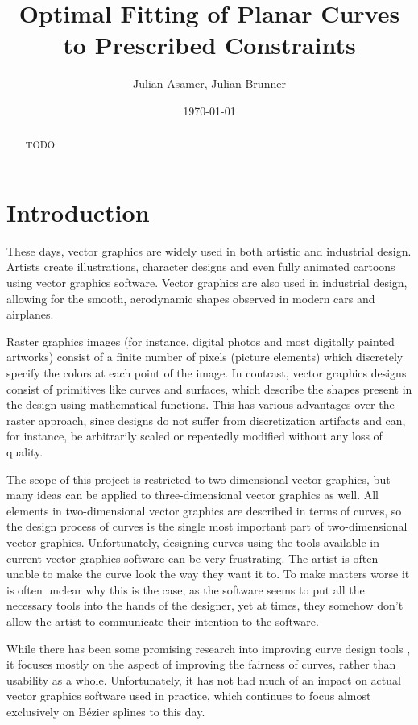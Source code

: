\documentclass[a4paper]{article}
\title{Optimal Fitting of Planar Curves to Prescribed Constraints}
\author{Julian Asamer, Julian Brunner}
\date{\today}
\begin{document}
	\maketitle

	\begin{abstract}

		\noindent TODO

	\end{abstract}

	\section{Introduction}
	\label{section:introduction}

		These days, vector graphics are widely used in both artistic and industrial design. Artists create illustrations, character designs and even fully animated cartoons using vector graphics software. Vector graphics are also used in industrial design, allowing for the smooth, aerodynamic shapes observed in modern cars and airplanes.

		Raster graphics images (for instance, digital photos and most digitally painted artworks) consist of a finite number of pixels (picture elements) which discretely specify the colors at each point of the image. In contrast, vector graphics designs consist of primitives like curves and surfaces, which describe the shapes present in the design using mathematical functions. This has various advantages over the raster approach, since designs do not suffer from discretization artifacts and can, for instance, be arbitrarily scaled or repeatedly modified without any loss of quality.

		The scope of this project is restricted to two-dimensional vector graphics, but many ideas can be applied to three-dimensional vector graphics as well. All elements in two-dimensional vector graphics are described in terms of curves, so the design process of curves is the single most important part of two-dimensional vector graphics. Unfortunately, designing curves using the tools available in current vector graphics software can be very frustrating. The artist is often unable to make the curve look the way they want it to. To make matters worse it is often unclear why this is the case, as the software seems to put all the necessary tools into the hands of the designer, yet at times, they somehow don't allow the artist to communicate their intention to the software.

		While there has been some promising research into improving curve design tools \cite{thesis-mvc} \cite{thesis-spiro}, it focuses mostly on the aspect of improving the fairness of curves, rather than usability as a whole. Unfortunately, it has not had much of an impact on actual vector graphics software used in practice, which continues to focus almost exclusively on Bézier splines to this day.
\end{document}
